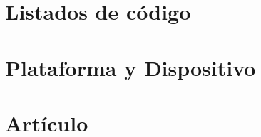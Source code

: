 \documentclass[11pt,a4paper,spanish]{book}
\begin{document}
\chapter{Listados de código}\label{app:codigo}


\chapter{Plataforma y Dispositivo}\label{app:plataforma}


\chapter{Artículo}

\end{document}
